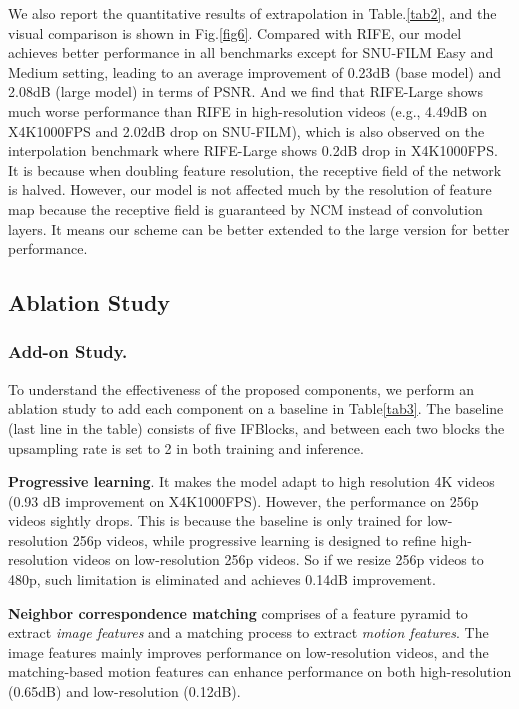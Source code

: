 \documentclass[sigconf]{acmart}
\begin{document}
We also report the quantitative results of extrapolation in Table.\ref{tab2}, and the visual comparison is shown in Fig.\ref{fig6}. Compared with RIFE, our model achieves better performance in all benchmarks except for SNU-FILM Easy and Medium setting, leading to an average improvement of 0.23dB (base model) and 2.08dB (large model) in terms of PSNR. And we find that RIFE-Large shows much worse performance than RIFE in high-resolution videos (e.g., 4.49dB on X4K1000FPS and 2.02dB drop on SNU-FILM), which is also observed on the interpolation benchmark where RIFE-Large shows 0.2dB drop in X4K1000FPS. It is because when doubling feature resolution, the receptive field of the network is halved. However, our model is not affected much by the resolution of feature map because the receptive field is guaranteed by NCM instead of convolution layers. It means our scheme can be better extended to the large version for better performance.


\subsection{Ablation Study}

\subsubsection{Add-on Study.}
To understand the effectiveness of the proposed components, we perform an ablation study to add each component on a baseline in Table\ref{tab3}. The baseline (last line in the table) consists of five IFBlocks, and between each two blocks the upsampling rate is set to 2 in both training and inference. 

\textbf{Progressive learning}. It makes the model adapt to high resolution 4K videos (0.93 dB improvement on X4K1000FPS). However, the performance on 256p videos sightly drops. This is because the baseline is only trained for low-resolution 256p videos, while progressive learning is designed to refine high-resolution videos on low-resolution 256p videos. So if we resize 256p videos to 480p, such limitation is eliminated and achieves 0.14dB improvement.

\textbf{Neighbor correspondence matching} comprises of a feature pyramid to extract \textit{image features} and a matching process to extract \textit{motion features}. The image features mainly improves performance on low-resolution videos, and the matching-based motion features can enhance performance on both high-resolution (0.65dB) and low-resolution (0.12dB).
\end{document}

